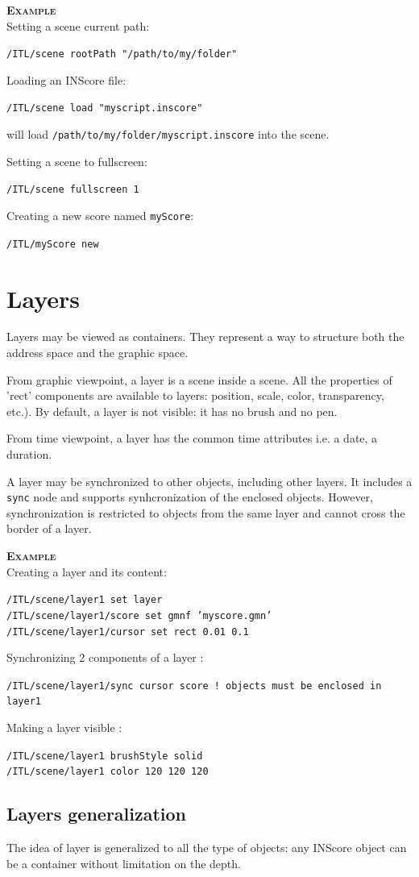 \documentclass[a4paper,twoside]{report}
\newcommand{\toplevel}[1]	{\chapter{#1}}
\newcommand{\sublevel}[1]	{\section{#1}}
\newcommand{\OSC}[1]		{\texttt{#1}}
\newcommand{\example}		{\textbf{\hspace{-1.5cm}\textbf{\textsc{Example }}}}
\newcommand{\sample}	[1]			{\vspace{-2mm}\begin{center}\colorbox{mygrey}{
								\begin{minipage}[t]{0.9\columnwidth} 
								{\small \texttt{#1}}
								\end{minipage}}\end{center}}
\newcommand{\sampleindent}	{ \hspace{0.5cm} }
\begin{document}
\example \\
Setting a scene current path:
\sample{/ITL/scene rootPath "/path/to/my/folder"}
Loading an INScore file:
\sample{/ITL/scene load "myscript.inscore"}
\sampleindent will load \OSC{/path/to/my/folder/myscript.inscore} into the scene. 

Setting a scene to fullscreen:
\sample{/ITL/scene fullscreen 1}
Creating a new score named \OSC{myScore}:
\sample{/ITL/myScore new}


\toplevel{Layers}
\label{layers}

Layers may be viewed as containers. They represent a way to structure both the address space and the graphic space. 

From graphic viewpoint, a layer is a scene inside a scene. All the properties of 'rect' components are available to layers: position, scale, color, transparency, etc.). By default, a layer is not visible: it has no brush and no pen.

From time viewpoint, a layer has the common time attributes i.e. a date, a duration.

A layer may be synchronized to other objects, including other layers. It includes a \OSC{sync} node and supports synhcronization of the enclosed objects. However, synchronization is restricted to objects from the same layer and cannot cross the border of a layer. 


\example \\
Creating a layer and its content:
\sample{/ITL/scene/layer1 set layer\\
/ITL/scene/layer1/score set gmnf 'myscore.gmn'\\
/ITL/scene/layer1/cursor set rect 0.01 0.1}

Synchronizing 2 components of a layer :
\sample{/ITL/scene/layer1/sync cursor score	! objects must be enclosed in layer1
}

Making a layer visible :
\sample{/ITL/scene/layer1 brushStyle solid \\
/ITL/scene/layer1 color 120 120 120 
}

\sublevel{Layers generalization}
\label{layersgen}

The idea of layer is generalized to all the type of objects: any INScore object can be a container without limitation on the depth.


%
\end{document}
